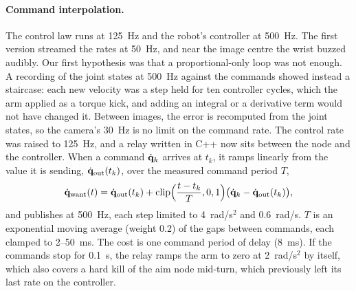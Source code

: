 \paragraph{Command interpolation.} The control law runs at 125~Hz and the robot's controller at
500~Hz. The first version streamed the rates at 50~Hz, and near the image centre the wrist buzzed
audibly. Our first hypothesis was that a proportional-only loop was not enough. A recording of the
joint states at 500~Hz against the commands showed instead a staircase: each new velocity was a
step held for ten controller cycles, which the arm applied as a torque kick, and adding an
integral or a derivative term would not have changed it. Between images, the error is recomputed
from the joint states, so the camera's 30~Hz is no limit on the command rate. The control rate was
raised to 125~Hz, and a relay written in C++ now sits between the node and the controller. When a
command $\dot{\mathbf{q}}_k$ arrives at $t_k$, it ramps linearly from the value it is sending,
$\dot{\mathbf{q}}_{\mathrm{out}}(t_k)$, over the measured command period $T$,
\begin{equation}
\dot{\mathbf{q}}_{\mathrm{want}}(t) = \dot{\mathbf{q}}_{\mathrm{out}}(t_k) + \operatorname{clip}\!\Big(\frac{t-t_k}{T},0,1\Big)\big(\dot{\mathbf{q}}_k-\dot{\mathbf{q}}_{\mathrm{out}}(t_k)\big),
\label{eq:relay}
\end{equation}
and publishes at 500~Hz, each step limited to 4~rad/s$^2$ and 0.6~rad/s. $T$ is an exponential
moving average (weight 0.2) of the gaps between commands, each clamped to 2--50~ms. The cost is one command period of delay (8~ms). If the
commands stop for 0.1~s, the relay ramps the arm to zero at 2~rad/s$^2$ by itself, which also
covers a hard kill of the aim node mid-turn, which previously left its last rate on the
controller.

